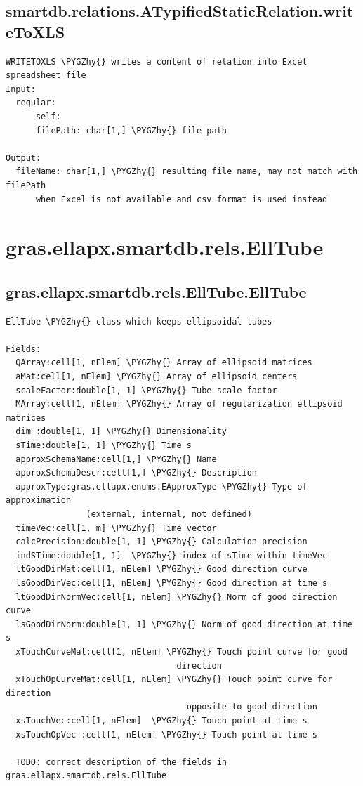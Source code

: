 \documentclass[letterpaper,10pt,english]{sphinxmanual}
\def\PYGZhy{\char`\-}
\begin{document}
\subsection{smartdb.relations.ATypifiedStaticRelation.writeToXLS}
\label{chap_functions:smartdb-relations-atypifiedstaticrelation-writetoxls}
\begin{Verbatim}[commandchars=\\\{\}]
WRITETOXLS \PYGZhy{} writes a content of relation into Excel spreadsheet file
Input:
  regular:
      self:
      filePath: char[1,] \PYGZhy{} file path

Output:
  fileName: char[1,] \PYGZhy{} resulting file name, may not match with filePath
      when Excel is not available and csv format is used instead
\end{Verbatim}


\section{gras.ellapx.smartdb.rels.EllTube}
\label{chap_functions:gras-ellapx-smartdb-rels-elltube}

\subsection{gras.ellapx.smartdb.rels.EllTube.EllTube}
\label{chap_functions:gras-ellapx-smartdb-rels-elltube-elltube}
\begin{Verbatim}[commandchars=\\\{\}]
EllTube \PYGZhy{} class which keeps ellipsoidal tubes

Fields:
  QArray:cell[1, nElem] \PYGZhy{} Array of ellipsoid matrices
  aMat:cell[1, nElem] \PYGZhy{} Array of ellipsoid centers
  scaleFactor:double[1, 1] \PYGZhy{} Tube scale factor
  MArray:cell[1, nElem] \PYGZhy{} Array of regularization ellipsoid matrices
  dim :double[1, 1] \PYGZhy{} Dimensionality
  sTime:double[1, 1] \PYGZhy{} Time s
  approxSchemaName:cell[1,] \PYGZhy{} Name
  approxSchemaDescr:cell[1,] \PYGZhy{} Description
  approxType:gras.ellapx.enums.EApproxType \PYGZhy{} Type of approximation
                (external, internal, not defined)
  timeVec:cell[1, m] \PYGZhy{} Time vector
  calcPrecision:double[1, 1] \PYGZhy{} Calculation precision
  indSTime:double[1, 1]  \PYGZhy{} index of sTime within timeVec
  ltGoodDirMat:cell[1, nElem] \PYGZhy{} Good direction curve
  lsGoodDirVec:cell[1, nElem] \PYGZhy{} Good direction at time s
  ltGoodDirNormVec:cell[1, nElem] \PYGZhy{} Norm of good direction curve
  lsGoodDirNorm:double[1, 1] \PYGZhy{} Norm of good direction at time s
  xTouchCurveMat:cell[1, nElem] \PYGZhy{} Touch point curve for good
                                  direction
  xTouchOpCurveMat:cell[1, nElem] \PYGZhy{} Touch point curve for direction
                                    opposite to good direction
  xsTouchVec:cell[1, nElem]  \PYGZhy{} Touch point at time s
  xsTouchOpVec :cell[1, nElem] \PYGZhy{} Touch point at time s

  TODO: correct description of the fields in gras.ellapx.smartdb.rels.EllTube
\end{Verbatim}
\end{document}
